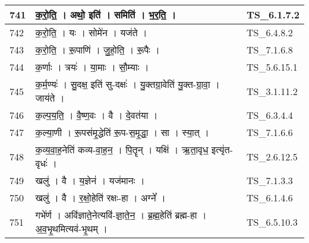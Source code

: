 \documentclass[17pt]{extarticle}
\begin{document}
\begin{longtable}{||p{0.4in}||p{4.9in}||p{0.9in}||}
    \hline
        
    741 & क॒रो॒ति॒   ।   अथो॒ इति॑   ।   समिति॑   ।   भ॒र॒ति॒   ।    & TS\_6.1.7.2       \\
    
    \hline
        
    742 & क॒रो॒ति॒   ।   यः   ।   सोमे॑न   ।   यज॑ते   ।    & TS\_6.4.8.2       \\
    
    \hline
        
    743 & क॒रो॒ति॒   ।   रू॒पाणि॑   ।   जु॒हो॒ति॒   ।   रू॒पैः   ।    & TS\_7.1.6.8       \\
    
    \hline
        
    744 & क॒र्णाः   ।   त्रयः॑   ।   या॒माः   ।   सौ॒म्याः   ।    & TS\_5.6.15.1       \\
    
    \hline
        
    745 & क॒र्म॒ण्यः॑   ।   सु॒दक्ष॒ इति॑ सु{-}दक्षः॑   ।   यु॒क्तग्रा॒वेति॑ यु॒क्त{-}ग्रा॒वा॒   ।   जाय॑ते   ।    & TS\_3.1.11.2       \\
    
    \hline
        
    746 & क॒ल्प॒य॒ति॒   ।   वै॒ष्ण॒वः   ।   वै   ।   दे॒वत॑या   ।    & TS\_6.3.4.4       \\
    
    \hline
        
    747 & क॒ल्या॒णी   ।   रू॒पस॑मृ॒द्धेति॑ रू॒प{-}स॒मृ॒द्धा॒   ।   सा   ।   स्या॒त्   ।    & TS\_7.1.6.6       \\
    
    \hline
        
    748 & क॒व्य॒वा॒ह॒नेति॑ कव्य{-}वा॒ह॒न॒   ।   पि॒तॄन्   ।   यक्षि॑   ।   ऋ॒ता॒वृध॒ इत्यृ॑त{-}वृधः॑   ।    & TS\_2.6.12.5       \\
    
    \hline
        
    749 & खलु॑   ।   वै   ।   य॒ज्ञेन॑   ।   यज॑मानः   ।    & TS\_7.1.3.3       \\
    
    \hline
        
    750 & खलु॑   ।   वै   ।   र॒क्षो॒हेति॑ रक्षः{-}हा   ।   अग्ने᳚   ।    & TS\_6.1.4.6       \\
    
    \hline
        
    751 & गभे॑र्ण   ।   अवि॑ज्ञाते॒नेत्यवि॑{-}ज्ञा॒ते॒न॒   ।   ब्र॒ह्म॒हेति॑ ब्रह्म{-}हा   ।   अ॒व॒भृ॒थमित्यव॑{-}भृ॒थम्   ।    & TS\_6.5.10.3       \\
    

\end{longtable}
\end{document}
